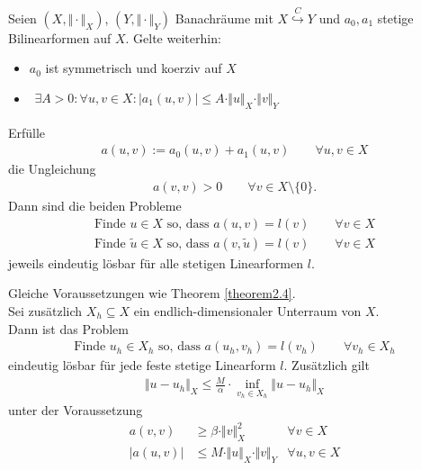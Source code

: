 \begin{theorem}\label{theorem2.4} %
Seien $(X,\Vert\cdot\Vert_X)$, $(Y,\Vert\cdot\Vert_Y)$ Banachräume  mit $X\stackrel{C}{\hookrightarrow} Y$ und $a_0,a_1$ stetige Bilinearformen auf $X$. Gelte weiterhin:
\begin{itemize}
\item $a_0$ ist symmetrisch und koerziv auf $X$
\item $\begin{aligned}
\exists A>0:\forall u,v\in X:\big|a_1(u,v)\big|\leq A\cdot\Vert u\Vert_X\cdot\Vert v\Vert_Y
\end{aligned}$
\end{itemize}
Erfülle
\begin{align*}
a(u,v):=a_0(u,v)+a_1(u,v)\qquad\forall u,v\in X
\end{align*}
die Ungleichung
\begin{align*}
a(v,v)>0\qquad\forall v\in X\setminus\lbrace0\rbrace.
\end{align*}
Dann sind die beiden Probleme
\begin{align*}
\text{Finde }u\in X\text{ so, dass }
a(u,v)=l(v)\qquad\forall v\in X\\
\text{Finde }\tilde{u}\in X\text{ so, dass }
a(v,\tilde{u})=l(v)\qquad\forall v\in X
\end{align*}
jeweils eindeutig lösbar für alle stetigen Linearformen $l$.
\end{theorem}

\begin{theorem} %
Gleiche Voraussetzungen wie Theorem \ref{theorem2.4}.\\
Sei zusätzlich $X_h\subseteq X$ ein endlich-dimensionaler Unterraum von $X$.\\
Dann ist das Problem
\begin{align*}
\text{Finde }u_h\in X_h\text{ so, dass }
a(u_h,v_h)=l(v_h)\qquad\forall v_h\in X_h
\end{align*}
eindeutig lösbar für jede feste stetige Linearform $l$. Zusätzlich gilt
\begin{align*}
\Vert u-u_h\Vert_X\leq\frac{M}{\alpha}\cdot\inf\limits_{v_h\in X_h}\Vert u-u_h\Vert_X
\end{align*}
unter der Voraussetzung
\begin{align*}
a(v,v)&\geq\beta\cdot\Vert v\Vert^2_X &\forall v\in X\\
\big|a(u,v)\big|&\leq M\cdot\Vert u\Vert_X\cdot\Vert v\Vert_Y &\forall u,v\in X
\end{align*}
\end{theorem}

